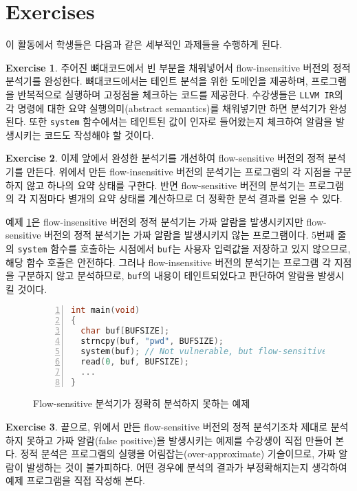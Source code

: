 \documentclass[a4paper, 11pt]{article}
\theoremstyle{definition}
\newtheorem{exercise}{Exercise}
\begin{document}
\section{Exercises}

이 활동에서 학생들은 다음과 같은 세부적인 과제들을 수행하게 된다.

\begin{exercise}
 주어진 뼈대코드에서 빈 부분을 채워넣어서 flow-insensitive 버전의 정적 분석기를
완성한다. 뼈대코드에서는 테인트 분석을 위한 도메인을 제공하며, 프로그램을
반복적으로 실행하며 고정점을 체크하는 코드를 제공한다. 수강생들은 \texttt{LLVM
IR}의 각 명령에 대한 요약 실행의미(abstract semantics)를 채워넣기만 하면
분석기가 완성된다. 또한 \texttt{system} 함수에서는 테인트된 값이 인자로
들어왔는지 체크하여 알람을 발생시키는 코드도 작성해야 할 것이다.
\end{exercise}

\begin{exercise}
 이제 앞에서 완성한 분석기를 개선하여 flow-sensitive 버전의 정적 분석기를
만든다. 위에서 만든 flow-insensitive 버전의 분석기는 프로그램의 각 지점을
구분하지 않고 하나의 요약 상태를 구한다. 반면 flow-sensitive 버전의 분석기는
프로그램의 각 지점마다 별개의 요약 상태를 계산하므로 더 정확한 분석 결과를
얻을 수 있다.

 예제 \ref{fig:example}은 flow-insensitive 버전의 정적 분석기는 가짜 알람을
발생시키지만 flow-sensitive 버전의 정적 분석기는 가짜 알람을 발생시키지 않는
프로그램이다. 5번째 줄의 \texttt{system} 함수를 호출하는 시점에서
\texttt{buf}는 사용자 입력값을 저장하고 있지 않으므로, 해당 함수 호출은
안전하다. 그러나 flow-insensitive 버전의 분석기는 프로그램 각 지점을 구분하지
않고 분석하므로, \texttt{buf}의 내용이 테인트되었다고 판단하여 알람을 발생시킬
것이다.

\begin{figure}
\begin{lstlisting}[language=C, frame=single, basicstyle=\footnotesize,
numbers=left, numbersep=1em, xleftmargin=2em, showstringspaces=false]
int main(void)
{
  char buf[BUFSIZE];
  strncpy(buf, "pwd", BUFSIZE);
  system(buf); // Not vulnerable, but flow-sensitive analyzer will raise alarm
  read(0, buf, BUFSIZE);
  ...
}
\end{lstlisting}
 \caption{Flow-sensitive 분석기가 정확히 분석하지 못하는 예제}
  \label{fig:example}
\end{figure}
\end{exercise}

\begin{exercise}
 끝으로, 위에서 만든 flow-sensitive 버전의 정적 분석기조차 제대로 분석하지 못하고
가짜 알람(false positive)을 발생시키는 예제를 수강생이 직접 만들어 본다. 정적
분석은 프로그램의 실행을 어림잡는(over-approximate) 기술이므로, 가짜 알람이
발생하는 것이 불가피하다. 어떤 경우에 분석의 결과가 부정확해지는지 생각하여 예제
프로그램을 직접 작성해 본다.

\end{exercise}
\end{document}
